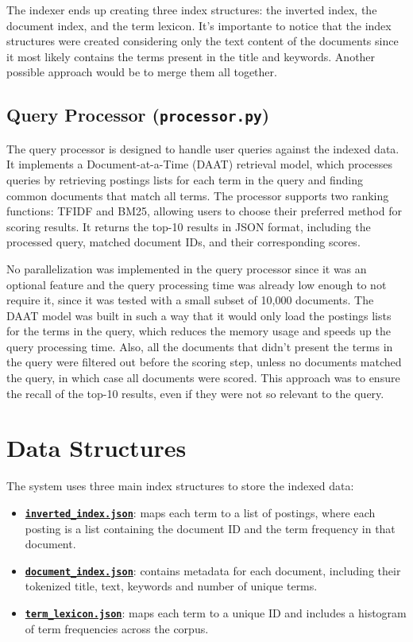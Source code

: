 The indexer ends up creating three index structures: the inverted index, the document index, and the term lexicon. It's importante to notice that the index structures were created considering only the text content of the documents since it most likely contains the terms present in the title and keywords. Another possible approach would be to merge them all together.

\subsection{Query Processor (\texttt{processor.py})} \label{subsec:processor}

The query processor is designed to handle user queries against the indexed data. It implements a Document-at-a-Time (DAAT) retrieval model, which processes queries by retrieving postings lists for each term in the query and finding common documents that match all terms. The processor supports two ranking functions: TFIDF and BM25, allowing users to choose their preferred method for scoring results. It returns the top-10 results in JSON format, including the processed query, matched document IDs, and their corresponding scores.

No parallelization was implemented in the query processor since it was an optional feature and the query processing time was already low enough to not require it, since it was tested with a small subset of 10,000 documents. The DAAT model was built in such a way that it would only load the postings lists for the terms in the query, which reduces the memory usage and speeds up the query processing time. Also, all the documents that didn't present the terms in the query were filtered out before the scoring step, unless no documents matched the query, in which case all documents were scored. This approach was to ensure the recall of the top-10 results, even if they were not so relevant to the query.

\section{Data Structures} \label{sec:data-structures}

The system uses three main index structures to store the indexed data:

\begin{itemize}
  \item \hyperref[subsec:ii]{\textbf{\texttt{inverted\_index.json}}}: maps each term to a list of postings, where each posting is a list containing the document ID and the term frequency in that document.
  \item \hyperref[subsec:di]{\textbf{\texttt{document\_index.json}}}: contains metadata for each document, including their tokenized title, text, keywords and number of unique terms.
  \item \hyperref[subsec:tl]{\textbf{\texttt{term\_lexicon.json}}}: maps each term to a unique ID and includes a histogram of term frequencies across the corpus.
\end{itemize}

